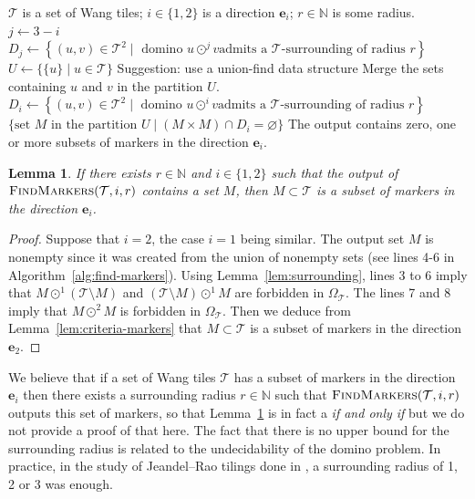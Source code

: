 \documentclass[12pt]{amsart}
\newtheorem{lemma}[definition]{Lemma}
\newcommand{\N}{\mathbb{N}}
\newcommand{\be}{{\boldsymbol{e}}}
\newcommand{\Tcal}{\mathcal{T}}
\begin{document}
\begin{algorithm}[h]
    \caption{Find markers.
        If no markers are found, one should try increasing the radius $r$.}
    \label{alg:find-markers}
  \begin{algorithmic}[1]
    \Require $\Tcal$ is a set of Wang tiles;
             $i\in\{1,2\}$ is a direction $\be_i$;
             $r\in\N$ is some radius.
      \Function{FindMarkers}{$\Tcal$, $i$, $r$}
        \State $j\gets 3-i$
        \State $D_j \gets \left\{(u,v)\in\Tcal^2\mid \text{ domino } u\odot^jv \text{
             admits a $\Tcal$-surrounding of radius $r$}\right\}$
        \State $U \gets \{\{u\}\mid u\in\Tcal\}$
            \Comment Suggestion: use a union-find data structure 
            \State Merge the sets containing $u$ and $v$ in the partition $U$.
        \EndFor
        \State $D_i \gets \left\{(u,v)\in\Tcal^2\mid \text{ domino } u\odot^iv \text{
             admits a $\Tcal$-surrounding of radius $r$}\right\}$
         \State\Return $\{\text{set } M \text{ in the partition } U \mid
                               \left(M\times M\right) \cap D_i=\varnothing\}$
      \EndFunction
      \Ensure The output contains zero, one or more subsets of markers 
              in the direction $\be_i$.
  \end{algorithmic}
\end{algorithm}

\begin{lemma}\label{lem:algo1-works}
    If there exists $r\in\N$ and $i\in\{1,2\}$ such that the output of
      $\Call{FindMarkers}{\Tcal, i, r}$
      contains a set $M$, then $M\subset\Tcal$ is a subset of markers in the
      direction $\be_i$.
\end{lemma}

\begin{proof}
    Suppose that $i=2$, the case $i=1$ being similar.
    The output set $M$ is nonempty since it was created from the union of
    nonempty sets (see lines 4-6 in Algorithm~\ref{alg:find-markers}).
    Using Lemma~\ref{lem:surrounding},
    lines 3 to 6 imply that
        $M\odot^1 (\Tcal\setminus M)$ and
        $(\Tcal\setminus M) \odot^1 M$
    are forbidden in $\Omega_\Tcal$.
    The lines 7 and 8 imply that
        $M\odot^2 M$ is forbidden in $\Omega_\Tcal$.
    Then we deduce from Lemma~\ref{lem:criteria-markers} that
    $M\subset\Tcal$ is a subset of markers in the direction~$\be_2$.
\end{proof}

We believe that if a set of Wang tiles $\Tcal$ has a subset of markers in the
direction $\be_i$ then there exists a surrounding radius $r\in\N$ such that
$\Call{FindMarkers}{\Tcal, i, r}$ outputs this set of markers, so that
Lemma~\ref{lem:algo1-works} is in fact a \emph{if and only if} but we do not
provide a proof of that here.
The fact that there is no upper bound for the surrounding radius is related to
the undecidability of the domino problem.
In practice, in the study of Jeandel--Rao tilings done in
\cite{MR4226493}, a surrounding radius of 1, 2 or 3 was
enough.
\end{document}
